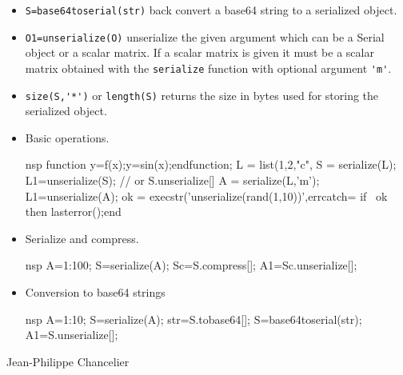 \begin{itemize}
  \item \verb+S=base64toserial(str)+ back convert a base64 string to a serialized object. 
  \item \verb+O1=unserialize(O)+ unserialize the given argument which can be a Serial object or a scalar matrix. 
    If a scalar matrix is given it must be a scalar matrix obtained with the \verb+serialize+ function with 
    optional argument \verb+'m'+. 
  \item \verb+size(S,'*')+ or \verb+length(S)+ returns the size in bytes used for storing the serialized object.
\end{itemize}

\begin{examples}
\begin{itemize}
\item Basic operations.
\begin{mintednsp}{nsp}
  function y=f(x);y=sin(x);endfunction;
  L = list(1,2,"c",%
  S = serialize(L);
  L1=unserialize(S); // or S.unserialize[]
  A = serialize(L,'m');
  L1=unserialize(A);
  ok = execstr('unserialize(rand(1,10))',errcatch=%
  if ~ok then lasterror();end
\end{mintednsp}
\item Serialize and compress.
\begin{mintednsp}{nsp}
  A=1:100;
  S=serialize(A);
  Sc=S.compress[];
  A1=Sc.unserialize[];
\end{mintednsp}
\item Conversion to base64 strings 
\begin{mintednsp}{nsp}
  A=1:10;
  S=serialize(A);
  str=S.tobase64[];
  S=base64toserial(str);
  A1=S.unserialize[];
\end{mintednsp}
\end{itemize}
\end{examples}

\begin{manseealso}
\end{manseealso}

\begin{authors}
   Jean-Philippe Chancelier
\end{authors}
